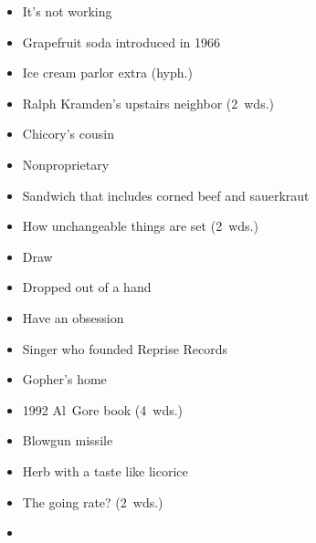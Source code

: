 {  \item
    \begin{itemize}
      \item
        It's not working
      \item
        Grapefruit soda introduced in 1966
    \end{itemize}
  \item
    \begin{itemize}
      \item
        Ice cream parlor extra (hyph.)
      \item
        Ralph Kramden's upstairs neighbor (2~wds.)
    \end{itemize}
  \item
    \begin{itemize}
      \item
        Chicory's cousin
      \item
        Nonproprietary
    \end{itemize}
  \item
    \begin{itemize}
      \item
        Sandwich that includes corned beef and sauerkraut
      \item
        How unchangeable things are set (2~wds.)
    \end{itemize}
  \item
    \begin{itemize}
      \item
        Draw
      \item
        Dropped out of a hand
    \end{itemize}
  \item
    \begin{itemize}
      \item
        Have an obsession
      \item
        Singer who founded Reprise Records
    \end{itemize}
}{%
  \item
    \begin{itemize}
      \item
        Gopher's home
      \item
        1992 Al~Gore book (4~wds.)
      \item
        Blowgun missile
      \item
        Herb with a taste like licorice
      \item
        The going rate? (2~wds.)
      \item

\end{itemize}}
